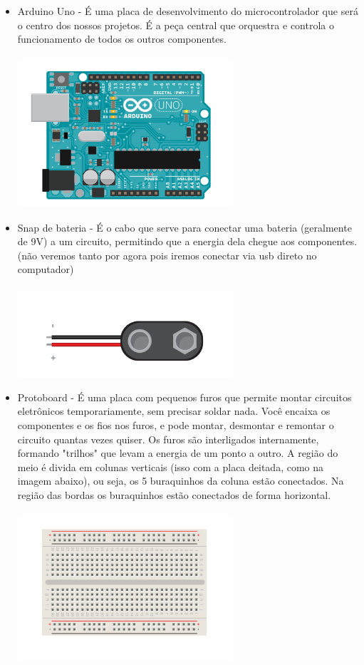 \documentclass{report}
\begin{document}
	\begin{itemize}
		\item Arduino Uno - É uma placa de desenvolvimento do microcontrolador que será o centro dos nossos projetos. É a peça central que orquestra e controla o funcionamento de todos os outros componentes.  \\ \\
		\includegraphics[width=8cm]{imagens/arduino_desenho.png}
		
		\item Snap de bateria -  É o cabo que serve para conectar uma bateria (geralmente de 9V) a um circuito, permitindo que a energia dela chegue aos componentes. (não veremos tanto por agora pois iremos conectar via usb direto no computador)\\ \\
		\includegraphics[width=8cm]{imagens/snap_bateria.png}
		
		\item Protoboard - É uma placa com pequenos furos que permite montar circuitos eletrônicos temporariamente, sem precisar soldar nada. Você encaixa os componentes e os fios nos furos, e pode montar, desmontar e remontar o circuito quantas vezes quiser. Os furos são interligados internamente, formando "trilhos" que levam a energia de um ponto a outro. A região do meio é divida em colunas verticais (isso com a placa deitada, como na imagem abaixo), ou seja, os 5 buraquinhos da coluna estão conectados. Na região das bordas os buraquinhos estão conectados de forma horizontal. \\ \\
		\includegraphics[width=8cm]{imagens/protoboard.png}
		

\end{itemize}
\end{document}
